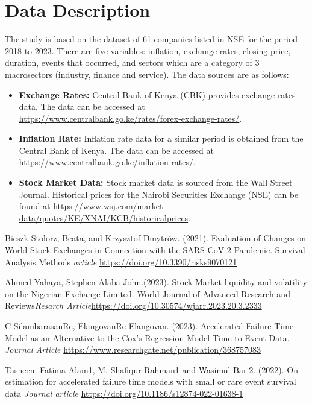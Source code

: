 \documentclass[twoside,a4paper,12pt]{article}
\begin{document}
\section*{Data Description}

The study is based on the dataset of 61 companies listed in NSE for the period 2018 to 2023. There are five variables: inflation, exchange rates, closing price, duration, events that occurred, and  sectors which are a category of 3 macrosectors (industry, finance and service). The data sources are as follows:

\begin{itemize}
    \item \textbf{Exchange Rates:} Central Bank of Kenya (CBK) provides exchange rates data. The data can be accessed at \url{https://www.centralbank.go.ke/rates/forex-exchange-rates/}.
    \item \textbf{Inflation Rate:} Inflation rate data for a similar period is obtained from the Central Bank of Kenya. The data can be accessed at \url{https://www.centralbank.go.ke/inflation-rates/}.
    \item \textbf{Stock Market Data:} Stock market data is sourced from the Wall Street Journal. Historical prices for the Nairobi Securities Exchange (NSE) can be found at \url{https://www.wsj.com/market-data/quotes/KE/XNAI/KCB/historicalprices}.

\end{itemize}
\begin{thebibliography}{}
Bieszk-Stolorz, Beata, and Krzysztof Dmytrów. (2021). Evaluation of Changes on World Stock Exchanges in Connection with the SARS-CoV-2 Pandemic. Survival Analysis Methods \textit{article} \newblock\href{https://doi.org/10.3390/risks9070121}{https://doi.org/10.3390/risks9070121}


 Ahmed Yahaya, Stephen Alaba John.(2023). Stock Market liquidity and volatility on the Nigerian Exchange Limited. World Journal of Advanced Research and Reviews\textit{Resarch Article}\newblock\href{https://doi.org/10.30574/wjarr.2023.20.3.2333}{https://doi.org/10.30574/wjarr.2023.20.3.2333}

C SilambarasanRe, ElangovanRe Elangovan. (2023). Accelerated Failure Time Model as an Alternative to the Cox's Regression Model Time to Event Data. \textit{Journal Article} \newblock\href{https://www.researchgate.net/publication/368757083}{https://www.researchgate.net/publication/368757083}

Tasneem Fatima Alam1, M. Shafiqur Rahman1 and Wasimul Bari2. (2022). On estimation for accelerated failure
time models with small or rare event survival data \textit{Journal article} \newblock \href{https://doi.org/10.1186/s12874-022-01638-1}{https://doi.org/10.1186/s12874-022-01638-1}


\end{thebibliography}
\end{document}
